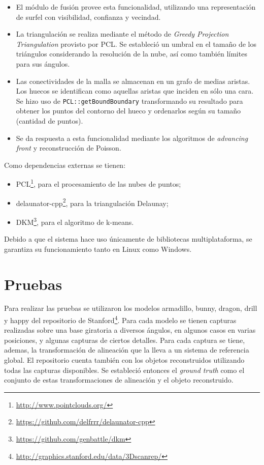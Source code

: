 \begin{itemize}
			\item  {}
				El módulo de fusión provee esta funcionalidad, utilizando una
				representación de surfel con visibilidad, confianza y vecindad.

			\item  {}
				La triangulación se realiza mediante el método de \emph{Greedy
				Projection Triangulation} provisto por PCL.
				Se estableció un umbral en el tamaño de los triángulos considerando la resolución de la nube,
				así como también límites para sus ángulos.

			\item  {}
				Las conectividades de la malla se almacenan en un grafo de medias aristas.
				Los huecos se identifican como aquellas aristas que inciden en sólo una cara.
				Se hizo uso de \texttt{PCL::getBoundBoundary} transformando su resultado para
				obtener los puntos del contorno del hueco y ordenarlos según su tamaño
				(cantidad de puntos).

			\item  {}
				Se da respuesta a esta funcionalidad mediante los algoritmos de \emph{advancing front} y reconstrucción de Poisson.
		\end{itemize}


		Como dependencias externas se tienen:
		\begin{itemize}
			\item PCL\footnote{\url{http://www.pointclouds.org/}},
				para el procesamiento de las nubes de puntos;
			\item delaunator-cpp\footnote{\url{https://github.com/delfrrr/delaunator-cpp}}, para la triangulación Delaunay;
			\item DKM\footnote{\url{https://github.com/genbattle/dkm}}, para el algoritmo de k-means.
		\end{itemize}
		Debido a que el sistema hace uso únicamente de bibliotecas multiplataforma,
		se garantiza su funcionamiento tanto en Linux como Windows.

	\section{Pruebas}
		Para realizar las pruebas se utilizaron los modelos
			armadillo,
			bunny,
			dragon,
			drill y
			happy del repositorio de Stanford\footnote{\url{http://graphics.stanford.edu/data/3Dscanrep/}}.
		Para cada modelo se tienen capturas realizadas sobre una base giratoria
		a diversos ángulos, en algunos casos en varias posiciones, y
		algunas capturas de ciertos detalles.
		Para cada captura se tiene, ademas, la transformación de alineación que
		la lleva a un sistema de referencia global.
		El repositorio cuenta también con los objetos reconstruidos utilizando
		todas las capturas disponibles.
		Se estableció entonces el \emph{ground truth} como el conjunto de estas
		transformaciones de alineación y el objeto reconstruido.

